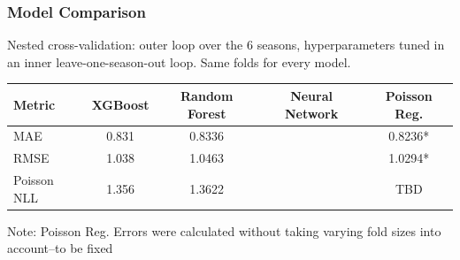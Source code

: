 \documentclass{beamer}
\begin{document}
\begin{frame}
  \frametitle{Model Comparison}

  Nested cross-validation: outer loop over the 6 seasons, hyperparameters
  tuned in an inner leave-one-season-out loop. Same folds for every model.


  \vspace{1em}
  \begin{center}
  \begin{tabular}{lcccc}
    \toprule
    Metric & XGBoost & Random Forest & Neural Network & Poisson Reg. \\
    \midrule
    MAE         & 0.831 & 0.8336 & & 0.8236*\\
    RMSE        & 1.038 & 1.0463 & & 1.0294*\\
    Poisson NLL & 1.356 & 1.3622 & & TBD\\
    \bottomrule
  \end{tabular}
  \end{center}

  {\footnotesize
    Note: Poisson Reg. Errors were calculated without taking varying fold sizes into account--to be fixed}
\end{frame}
\end{document}
